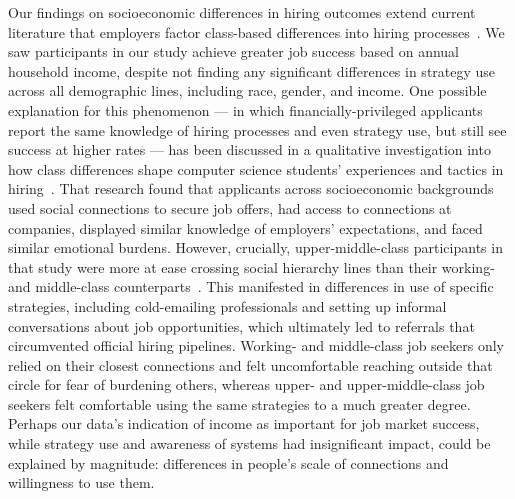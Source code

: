 Our findings on socioeconomic differences in hiring outcomes extend current literature that employers factor class-based differences into hiring processes~\cite{adnin2022hiring}. We saw participants in our study achieve greater job success based on annual household income, despite not finding any significant differences in strategy use across all demographic lines, including race, gender, and income. One possible explanation for this phenomenon --- in which financially-privileged applicants report the same knowledge of hiring processes and even strategy use, but still see success at higher rates --- has been discussed in a qualitative investigation into how class differences shape computer science students' experiences and tactics in hiring~\cite{chua2021playing}. That research found that applicants across socioeconomic backgrounds used social connections to secure job offers, had access to connections at companies, displayed similar knowledge of employers' expectations, and faced similar emotional burdens. However, crucially, upper-middle-class participants in that study were more at ease crossing social hierarchy lines than their working- and middle-class counterparts~\cite{chua2021playing}. This manifested in differences in use of specific strategies, including cold-emailing professionals and setting up informal conversations about job opportunities, which ultimately led to referrals that circumvented official hiring pipelines. 
Working- and middle-class job seekers only relied on their closest connections and felt uncomfortable reaching outside that circle for fear of burdening others, whereas upper- and upper-middle-class job seekers felt comfortable using the same strategies to a much greater degree. Perhaps our data's indication of income as important for job market success, while strategy use and awareness of systems had insignificant impact, could be explained by magnitude: differences in people's scale of connections and willingness to use them. 

